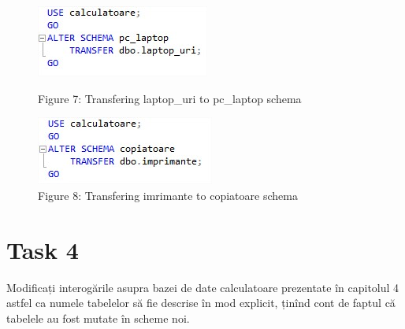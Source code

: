 \begin{figure}[H]
	\centering
		\includegraphics[width=\linewidth]{screens/8.jpg}
		\caption*{Figure 7: Transfering laptop\_uri to pc\_laptop schema}
		\label{}
	\endminipage\hfill
		\includegraphics[width=\linewidth]{screens/9.jpg}
		\caption*{Figure 8: Transfering imrimante to copiatoare schema}
	\endminipage
\end{figure}
\bigskip

\section{Task 4}
Modificați interogările asupra bazei de date calculatoare prezentate în capitolul 4 astfel ca numele tabelelor să fie descrise în mod explicit, ținînd cont de faptul că tabelele au fost mutate în scheme noi.

